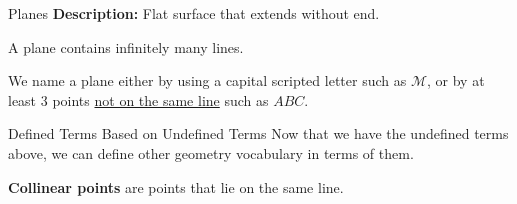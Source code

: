 \documentclass[t]{beamer}
\begin{document}
\begin{frame}{Planes}
\textbf{Description:} Flat surface that extends without end. \newline\\	\pause

A plane contains infinitely many lines.	\newline\\	\pause

We name a plane either by using a capital scripted letter such as $\mathcal{M}$, or by at least 3 points \underline{not on the same line} such as $ABC$.
\begin{center}
\end{center}
\end{frame}

\begin{frame}{Defined Terms Based on Undefined Terms}
Now that we have the undefined terms above, we can define other geometry vocabulary in terms of them.
\newline\\	\pause

\begin{tcolorbox}[colframe=green!20!black, colback = green!30!white,title=\textbf{Collinear Points}]
\textbf{Collinear points} are points that lie on the same line.
\end{tcolorbox}	\vspace{8pt}	\pause

\begin{center}
\end{center}
\end{frame}
\end{document}
